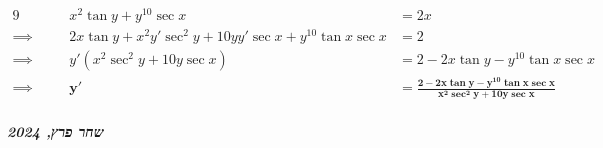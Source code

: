 \documentclass[]{article}
\newcommand\ndoc  {\dotfill \\ \vfil \hfil \textbf{\textit{שחר פרץ, 2024}} \hfil \vfil}
\newcommand\sex   {\sec x}        %
\newcommand\tanx  {\tan x}
\begin{document}
	\section{} %
	\begin{alignat*}{9}
		&&x^2 \tan y + y^{10} \sex &= 2x\\
		\implies \quad && 2x\tan y + x^2y'\sec^2y + 10yy'\sex + y^{10} \tanx \sex &= 2 \\
		\implies \quad && y'(x^2\sec^2 y + 10y\sex) &= 2 - 2x\tan y - y^{10}\tanx \sex \\
		\implies \quad && \bm{y'} &= \bm{\frac{2 - 2x\tan y - y^{10}\tanx \sex}{x^2\sec^2 y + 10y\sex}}
	\end{alignat*}
	\ndoc
\end{document}
